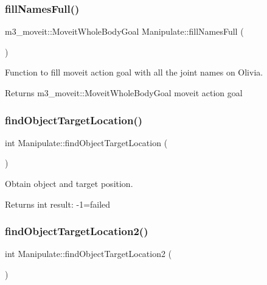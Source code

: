 \subsubsection{\texorpdfstring{fill\+Names\+Full()}{fillNamesFull()}}
{\footnotesize\ttfamily m3\+\_\+moveit\+::\+Moveit\+Whole\+Body\+Goal Manipulate\+::fill\+Names\+Full (\begin{DoxyParamCaption}{ }\end{DoxyParamCaption})\hspace{0.3cm}{\ttfamily [private]}}



Function to fill moveit action goal with all the joint names on Olivia. 

\begin{DoxyReturn}{Returns}
m3\+\_\+moveit\+::\+Moveit\+Whole\+Body\+Goal moveit action goal 
\end{DoxyReturn}
\mbox{\label{structManipulate_aa8b1c587db98b761dffdcc34a2a2b03c}} 
\subsubsection{\texorpdfstring{find\+Object\+Target\+Location()}{findObjectTargetLocation()}}
{\footnotesize\ttfamily int Manipulate\+::find\+Object\+Target\+Location (\begin{DoxyParamCaption}{ }\end{DoxyParamCaption})\hspace{0.3cm}{\ttfamily [private]}}



Obtain object and target position. 

\begin{DoxyReturn}{Returns}
int result\+: -\/1=failed 
\end{DoxyReturn}
\mbox{\label{structManipulate_a1ccca6fcd1ad2ac9d48a112cbb90fdf9}} 
\subsubsection{\texorpdfstring{find\+Object\+Target\+Location2()}{findObjectTargetLocation2()}}
{\footnotesize\ttfamily int Manipulate\+::find\+Object\+Target\+Location2 (\begin{DoxyParamCaption}{ }\end{DoxyParamCaption})\hspace{0.3cm}{\ttfamily [private]}}



